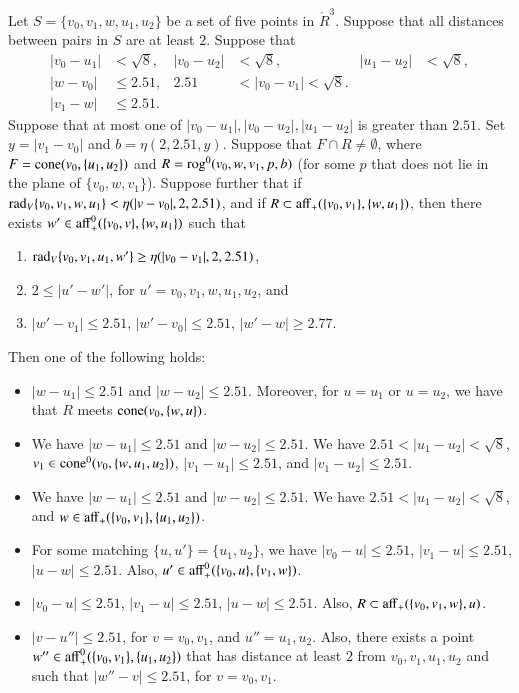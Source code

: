 \begin{lemma}
 Let $S=\{v_0,v_1,w,u_1,u_2\}$ be a set of five points
in $\ring{R}^3$.
Suppose that all distances between pairs in $S$ are at least $2$.
Suppose that 
   $$
   \begin{array}{rlrlrll}
   |v_0-u_1|&<\sqrt8,& |v_0-u_2|&<\sqrt8,& |u_1-u_2|&<\sqrt8,\\
   |w-v_0|&\le 2.51, &2.51&<|v_0-v_1|<\sqrt8.\\
   |v_1-w|&\le 2.51.
   \end{array}
   $$
Suppose that at most one of $|v_0-u_1|,|v_0-u_2|,|u_1-u_2|$ is
greater than $2.51$.
%
Set $y=|v_1-v_0|$ and $b=\eta(2,2.51,y)$.
Suppose that $F\cap R\ne\emptyset$, 
where $F={\operatorname{cone}}(v_0,\{u_1,u_2\})$ and
$R={\operatorname{rog}}^0(v_0,w,v_1,p,b)$ (for some $p$ that
does not lie in the plane of $\{v_0,w,v_1\}$).
Suppose further 
that if $\operatorname{rad}_V\{v_0,v_1,w,u_1\} < \eta(|v-v_0|,2,2.51)$, 
and if $R\subset {\operatorname{aff}}_+(\{v_0,v_1\},\{w,u_1\})$,
then there exists
$w'\in{\operatorname{aff}}_+^0(\{v_0,v\},\{w,u_1\})$ such that 
  \begin{enumerate}
  \item $\operatorname{rad}_V\{v_0,v_1,u_1,w'\} \ge \eta(|v_0-v_1|,2,2.51)$, 
  \item $2\le |u'-w'|$, for $u'=v_0,v_1,w,u_1,u_2$, and
  \item $|w'-v_1|\le 2.51$, $|w'-v_0|\le 2.51$, $|w'-w|\ge 2.77$.
  \end{enumerate}
Then one of the following holds:
  \begin{itemize}
  \item
  $|w-u_1|\le 2.51$ and  $|w-u_2|\le 2.51$.
  Moreover, for $u=u_1$ or $u=u_2$, we have that
  $R$ meets ${\operatorname{cone}}(v_0,\{w,u\})$.
  \item  We have $|w-u_1|\le 2.51$ and  $|w-u_2|\le 2.51$.
  We have $2.51<|u_1-u_2|<\sqrt8$, 
  $v_1\in{\operatorname{cone}}^0(v_0,\{w,u_1,u_2\})$, 
  $|v_1-u_1|\le 2.51$, and $|v_1-u_2|\le 2.51$.
  \item  We have $|w-u_1|\le 2.51$ and  $|w-u_2|\le 2.51$.
  We have $2.51<|u_1-u_2|<\sqrt8$, and 
  $w\in{\operatorname{aff}}_+(\{v_0,v_1\},\{u_1,u_2\})$.
  \item For some matching $\{u,u'\}=\{u_1,u_2\}$, we have
  $|v_0-u|\le 2.51$, $|v_1-u|\le 2.51$, $|u-w|\le 2.51$.
   Also, $u'\in {\operatorname{aff}}_+^0(\{v_0,u\},\{v_1,w\})$.
  \item $|v_0-u|\le 2.51$, $|v_1-u|\le 2.51$, $|u-w|\le 2.51$.
  Also, $R\subset {\operatorname{aff}}_+(\{v_0,v_1,w\},u)$.
  \item $|v-u''|\le 2.51$, for $v=v_0,v_1$, and $u''=u_1,u_2$.  Also,
   there exists a point $w''\in{\operatorname{aff}}_+^0(\{v_0,v_1\},\{u_1,u_2\})$ 
   that has distance at least $2$ from
   $v_0,v_1,u_1,u_2$ and such that
   $|w''-v|\le 2.51$, for $v=v_0,v_1$.
  \end{itemize}
\end{lemma}


